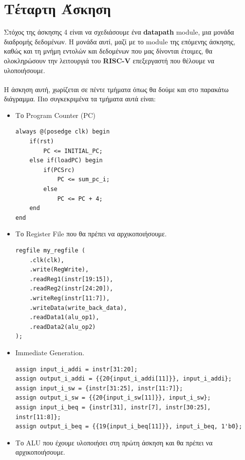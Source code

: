 \documentclass[a4paper,12pt]{report}
\def\tl{\textlatin}
\begin{document}
\chapter{Τέταρτη Άσκηση}
    \large Στόχος της άσκησης 4 είναι να σχεδιάσουμε ένα \textbf{\tl{datapath}} \tl{module}, μια μονάδα διαδρομής δεδομένων. Η μονάδα αυτί, μαζί με το \tl{module} της επόμενης άσκησης, καθώς και τη μνήμη εντολών και δεδομένων που μας δίνονται έτοιμες, θα ολοκληρώσουν την λειτουργιά του \textbf{\tl{RISC-V}} επεξεργαστή που θέλουμε να υλοποιήσουμε. \\ \\
    Η άσκηση αυτή, χωρίζεται σε πέντε τμήματα όπως θα δούμε και στο παρακάτω διάγραμμα. Πιο συγκεκριμένα τα τμήματα αυτά είναι:
     \begin{itemize}
        \item Το \tl{Program Counter (PC)}
            \vspace{0.5cm}
            \begin{lstlisting}[style=verilog]
always @(posedge clk) begin 
    if(rst)
        PC <= INITIAL_PC;
    else if(loadPC) begin 
        if(PCSrc)
            PC <= sum_pc_i;
        else
            PC <= PC + 4;
    end
end
            \end{lstlisting}
        \item Το \tl{Register File} που θα πρέπει να αρχικοποιήσουμε.
            \vspace{0.5cm}
            \begin{lstlisting}[style=verilog]
regfile my_regfile (
    .clk(clk),
    .write(RegWrite),
    .readReg1(instr[19:15]),
    .readReg2(instr[24:20]),
    .writeReg(instr[11:7]),
    .writeData(write_back_data),
    .readData1(alu_op1),
    .readData2(alu_op2)
);
            \end{lstlisting}
        \item \tl{Immediate Generation}.
            \vspace{0.5cm}
            \begin{lstlisting}[style=verilog]
assign input_i_addi = instr[31:20];
assign output_i_addi = {{20{input_i_addi[11]}}, input_i_addi};
assign input_i_sw = {instr[31:25], instr[11:7]};
assign output_i_sw = {{20{input_i_sw[11]}}, input_i_sw};
assign input_i_beq = {instr[31], instr[7], instr[30:25], instr[11:8]};
assign output_i_beq = {{19{input_i_beq[11]}}, input_i_beq, 1'b0};
            \end{lstlisting}
        \item Το \tl{ALU} που έχουμε υλοποιήσει στη πρώτη άσκηση και θα πρέπει να αρχικοποιήσουμε.

\end{itemize}
\end{document}
